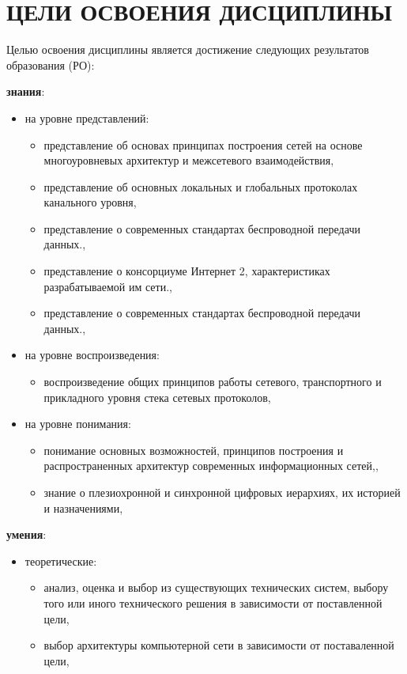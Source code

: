 \newpage
\section{ЦЕЛИ ОСВОЕНИЯ ДИСЦИПЛИНЫ}
Целью освоения дисциплины является достижение следующих результатов образования (РО):\\

{\parindent0pt
\textbf{знания}:
\begin{itemize}
\item на уровне представлений:
\begin{itemize}
\item представление об основах принципах построения сетей на основе многоуровневых архитектур и межсетевого взаимодействия,\item представление об основных локальных и глобальных протоколах канального уровня,\item представление о современных стандартах беспроводной передачи данных.,\item представление о консорциуме Интернет 2, характеристиках разрабатываемой им сети.,\item представление о современных стандартах беспроводной передачи данных.,
\end{itemize}
\item на уровне воспроизведения:
\begin{itemize}
\item воспроизведение общих принципов работы сетевого, транспортного и прикладного уровня стека сетевых протоколов,
\end{itemize}
\item на уровне понимания:
\begin{itemize}
\item понимание основных возможностей, принципов построения и распространенных архитектур современных информационных сетей,,\item знание о плезиохронной и синхронной цифровых иерархиях, их историей и назначениями,
\end{itemize}
\end{itemize}
\textbf{умения}:\\
\begin{itemize}
\item теоретические:
\begin{itemize}
\item анализ, оценка и выбор из существующих технических систем, выбору того или иного технического решения в зависимости от поставленной цели,\item выбор архитектуры компьютерной сети в зависимости от поставаленной цели,

\end{itemize}
\end{itemize}}
